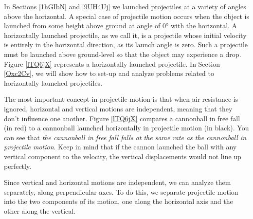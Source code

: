 \documentclass[main-physics.tex]{subfiles}
\begin{document}
\vspace{1em}

In Sections \ref{1hGIbN} and \ref{9UH4Uj} we launched projectiles at a variety of angles above the horizontal. A special case of projectile motion occurs when the object is launched from some height above ground at angle of \ang{0} with the horizontal. A \gls{horizontally launched projectile}, as we call it, is a projectile whose initial velocity is entirely in the horizontal direction, as its launch angle is zero. Such a projectile must be launched above ground-level so that the object may experience a drop. Figure \ref{lTQ6jX} represents a horizontally launched projectile. In Section \ref{Qxc2Cv}, we will show how to set-up and analyze problems related to horizontally launched projectiles.

\vspace{1em}

The most important concept in projectile motion is that when air resistance is ignored, horizontal and vertical motions are independent, meaning that they don't influence one another. Figure \ref{lTQ6jX} compares a cannonball in free fall (in red) to a cannonball launched horizontally in projectile motion (in black). You can see that \textit{the cannonball in free fall falls at the same rate as the cannonball in projectile motion}. Keep in mind that if the cannon launched the ball with any vertical component to the velocity, the vertical displacements would not line up perfectly.

\vspace{1em}

Since vertical and horizontal motions are independent, we can analyze them separately, along perpendicular axes. To do this, we separate projectile motion into the two components of its motion, one along the horizontal axis and the other along the vertical.
\end{document}
